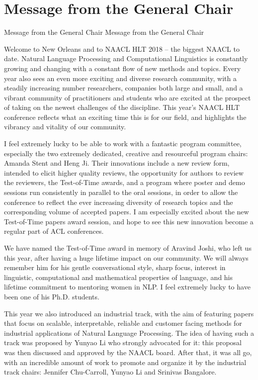 \vspace{2em}

\section{Message from the General Chair}\vspace{2em}
\setheaders%
    {Message from the General Chair}%
    {Message from the General Chair}
\thispagestyle{emptyheader}


Welcome to New Orleans and to NAACL HLT 2018 – the biggest NAACL to
date.  Natural Language Processing and Computational Linguistics is
constantly growing and changing with a constant flow of new methods
and topics. Every year also sees an even more exciting and diverse
research community, with a steadily increasing number researchers,
companies both large and small, and a vibrant community of
practitioners and students who are excited at the prospect of taking
on the newest challenges of the discipline.  This year’s NAACL HLT
conference reflects what an exciting time this is for our field, and
highlights the vibrancy and vitality of our community.

I feel extremely lucky to be able to work with a fantastic program
committee, especially the two extremely dedicated, creative and
resourceful program chairs: Amanda Stent and Heng Ji. Their
innovations include a new review form, intended to elicit higher
quality reviews, the opportunity for authors to review the reviewers,
the Test-of-Time awards, and a program where poster and demo sessions
run consistently in parallel to the oral sessions, in order to allow
the conference to reflect the ever increasing diversity of research
topics and the corresponding volume of accepted papers.  I am
especially excited about the new Test-of-Time papers award session,
and hope to see this new innovation become a regular part of ACL
conferences.

We have	named the Test-of-Time award in memory of Aravind Joshi, who
left us this year, after having a huge lifetime impact on our
community. We will always remember him for his gentle conversational
style, sharp focus, interest in linguistic, computational and
mathematical properties of language, and his lifetime commitment to
mentoring women in NLP.	I feel extremely lucky to have been one	of his
Ph.D. students.

This year we also introduced an industrial track, with the aim of
featuring papers that focus on scalable, interpretable, reliable and
customer facing methods for industrial applications of Natural
Language Processing. The idea of having such a track was proposed by
Yunyao Li who strongly advocated for it: this proposal was then
discussed and approved by the NAACL board. After that, it was all go,
with an incredible amount of work to promote and organize it by the
industrial track chairs: Jennifer Chu-Carroll, Yunyao Li and Srinivas
Bangalore.


